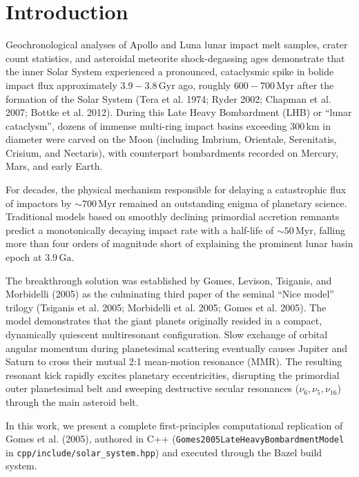 \documentclass[11pt,a4paper]{article}
\begin{document}
\section{Introduction}
Geochronological analyses of Apollo and Luna lunar impact melt samples, crater count statistics, and asteroidal meteorite shock-degassing ages demonstrate that the inner Solar System experienced a pronounced, cataclysmic spike in bolide impact flux approximately $3.9 - 3.8\,\text{Gyr}$ ago, roughly $600 - 700\,\text{Myr}$ after the formation of the Solar System (Tera et al. 1974; Ryder 2002; Chapman et al. 2007; Bottke et al. 2012). During this Late Heavy Bombardment (LHB) or ``lunar cataclysm'', dozens of immense multi-ring impact basins exceeding $300\,\text{km}$ in diameter were carved on the Moon (including Imbrium, Orientale, Serenitatis, Crisium, and Nectaris), with counterpart bombardments recorded on Mercury, Mars, and early Earth.

For decades, the physical mechanism responsible for delaying a catastrophic flux of impactors by $\sim 700\,\text{Myr}$ remained an outstanding enigma of planetary science. Traditional models based on smoothly declining primordial accretion remnants predict a monotonically decaying impact rate with a half-life of $\sim 50\,\text{Myr}$, falling more than four orders of magnitude short of explaining the prominent lunar basin epoch at $3.9\,\text{Ga}$.

The breakthrough solution was established by Gomes, Levison, Tsiganis, and Morbidelli (2005) as the culminating third paper of the seminal ``Nice model'' trilogy (Tsiganis et al. 2005; Morbidelli et al. 2005; Gomes et al. 2005). The model demonstrates that the giant planets originally resided in a compact, dynamically quiescent multiresonant configuration. Slow exchange of orbital angular momentum during planetesimal scattering eventually causes Jupiter and Saturn to cross their mutual 2:1 mean-motion resonance (MMR). The resulting resonant kick rapidly excites planetary eccentricities, disrupting the primordial outer planetesimal belt and sweeping destructive secular resonances ($\nu_6, \nu_5, \nu_{16}$) through the main asteroid belt.

In this work, we present a complete first-principles computational replication of Gomes et al. (2005), authored in C++ (\texttt{Gomes2005LateHeavyBombardmentModel} in \texttt{cpp/include/solar\_system.hpp}) and executed through the Bazel build system.
\end{document}

